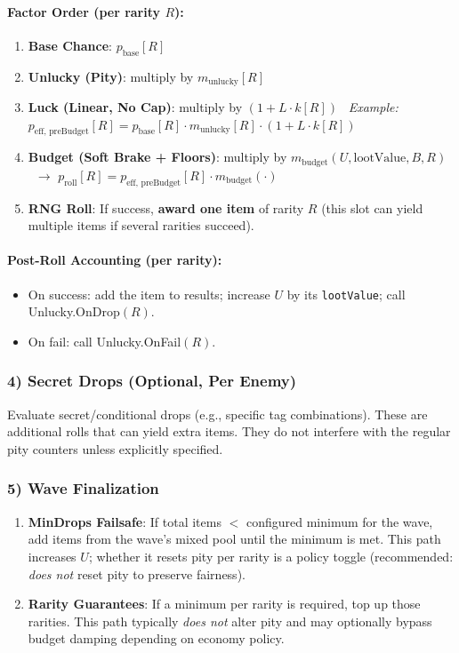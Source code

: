 \paragraph*{Factor Order (per rarity $R$):}
\begin{enumerate}
	\item \textbf{Base Chance}: $p_{\text{base}}[R]$
	\item \textbf{Unlucky (Pity)}: multiply by $m_{\text{unlucky}}[R]$
	\item \textbf{Luck (Linear, No Cap)}: multiply by $(1 + L \cdot k[R])$ \
	\emph{Example:} $p_{\text{eff, preBudget}}[R] = p_{\text{base}}[R] \cdot m_{\text{unlucky}}[R] \cdot (1 + L \cdot k[R])$
	\item \textbf{Budget (Soft Brake + Floors)}: multiply by $m_{\text{budget}}(U, \text{lootValue}, B, R)$ \
	$\rightarrow$ $p_{\text{roll}}[R] = p_{\text{eff, preBudget}}[R] \cdot m_{\text{budget}}(\cdot)$
	\item \textbf{RNG Roll}: If success, \textbf{award one item} of rarity $R$ (this slot can yield multiple items if several rarities succeed).
\end{enumerate}

\paragraph*{Post-Roll Accounting (per rarity):}
\begin{itemize}
	\item On success: add the item to results; increase $U$ by its \texttt{lootValue}; call Unlucky.OnDrop$(R)$.
	\item On fail: call Unlucky.OnFail$(R)$.
\end{itemize}

\subsubsection*{4) Secret Drops (Optional, Per Enemy)}
Evaluate secret/conditional drops (e.g., specific tag combinations). These are additional rolls that can yield extra items. They do not interfere with the regular pity counters unless explicitly specified.

\subsubsection*{5) Wave Finalization}
\begin{enumerate}
	\item \textbf{MinDrops Failsafe}: If total items $<$ configured minimum for the wave, add items from the wave’s mixed pool until the minimum is met. This path increases $U$; whether it resets pity per rarity is a policy toggle (recommended: \emph{does not} reset pity to preserve fairness).
	\item \textbf{Rarity Guarantees}: If a minimum per rarity is required, top up those rarities. This path typically \emph{does not} alter pity and may optionally bypass budget damping depending on economy policy.
\end{enumerate}

